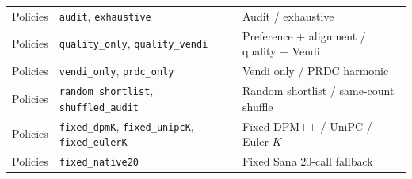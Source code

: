 \begin{minipage}{\textwidth}
\begin{tabular}{lll}
\midrule
Policies & \texttt{audit}, \texttt{exhaustive} & Audit / exhaustive \\
Policies & \texttt{quality\_only}, \texttt{quality\_vendi} & Preference + alignment / quality + Vendi \\
Policies & \texttt{vendi\_only}, \texttt{prdc\_only} & Vendi only / PRDC harmonic \\
Policies & \texttt{random\_shortlist}, \texttt{shuffled\_audit} & Random shortlist / same-count shuffle \\
Policies & \texttt{fixed\_dpmK}, \texttt{fixed\_unipcK}, \texttt{fixed\_eulerK} & Fixed DPM++ / UniPC / Euler $K$ \\
Policies & \texttt{fixed\_native20} & Fixed Sana 20-call fallback \\
\bottomrule
\end{tabular}
\label{tab:supp_identifiers}
\end{minipage}
